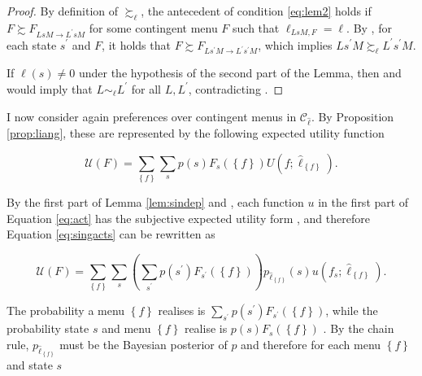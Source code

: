 \begin{proof}
	By definition of \( \succsim_{\ell} \), the antecedent of condition \eqref{eq:lem2} holds if \( F \succsim F_{LsM \rightarrow L^{\prime}sM} \) for some contingent menu \( F \) such that \( \ell_{LsM, F} = \ell \). By , for each state \( s^{\prime} \) and \( F \), it holds that \( F \succsim F_{Ls^{\prime}M \rightarrow L^{\prime}s^{\prime}M} \), which implies  \( L {s^{\prime}} M \succsim_{\ell} L^{\prime} {s^{\prime}} M \).

	If \( \ell \left( s \right) \neq 0 \) under the hypothesis of the second part of the Lemma, then  and  would imply that \( L \sim_{\ell} L^{\prime} \) for all \( L, L^{\prime} \), contradicting .
\end{proof}

I now consider again preferences over contingent menus in \( \mathcal{C}_{\widehat{\ell}} \). By Proposition \ref{prop:liang}, these are represented by the following expected utility function

\begin{equation}\label{eq:singacts}
	\mathscr{U} \left( F \right) = \sum_{\left\{ f \right\}} \sum_s p \left( s \right) F_s \left( \left\{ f \right\} \right) U \left( f ; \widehat{\ell}_{\left\{ f \right\}} \right) .
\end{equation}

By the first part of Lemma \ref{lem:sindep} and , each function \( u \) in the first part of Equation \eqref{eq:act} has the subjective expected utility form \citep[Theorem 13.2 pag. 177]{fishburnUtilityTheoryDecision1970}, and therefore Equation \eqref{eq:singacts} can be rewritten as

\[
	\mathscr{U} \left( F \right) = \sum_{\left\{ f \right\}} \sum_{s} \left( \sum_{s^{\prime}} p \left( s^{\prime} \right) F_{s^{\prime}} \left( \left\{ f \right\} \right) \right) p_{\widehat{\ell}_{\left\{ f \right\}}} \left( s \right) u \left( f_s ; \widehat{\ell}_{\left\{ f \right\}} \right) .
\]

The probability a menu \( \left\{ f \right\} \) realises is \( \sum_{s^{\prime}} p \left( s^{\prime} \right) F_{s^{\prime}} \left( \left\{ f \right\} \right) \), while the probability state \( s \) and menu \(\left\{ f \right\} \) realise is \( p \left( s \right) F_{s} \left( \left\{ f \right\} \right) \) . By the chain rule, \( p_{\widehat{\ell}_{\left\{ f \right\}}} \) must be the Bayesian posterior of \( p \) and therefore for each menu \( \left\{ f \right\} \) and state \( s \)

